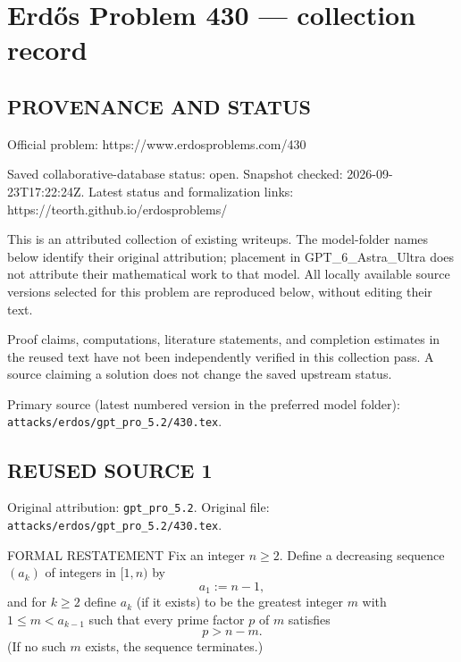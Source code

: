 \section*{Erd\H{o}s Problem 430 --- collection record}

\subsection*{PROVENANCE AND STATUS}
Official problem: https://www.erdosproblems.com/430

Saved collaborative-database status: open.
Snapshot checked: 2026-09-23T17:22:24Z.
Latest status and formalization links: https://teorth.github.io/erdosproblems/

This is an attributed collection of existing writeups. The model-folder names below identify their original attribution; placement in GPT\_6\_Astra\_Ultra does not attribute their mathematical work to that model. All locally available source versions selected for this problem are reproduced below, without editing their text.

Proof claims, computations, literature statements, and completion estimates in the reused text have not been independently verified in this collection pass. A source claiming a solution does not change the saved upstream status.

Primary source (latest numbered version in the preferred model folder): \texttt{attacks/erdos/gpt\_pro\_5.2/430.tex}.

\subsection*{REUSED SOURCE 1}
Original attribution: \texttt{gpt\_pro\_5.2}.
Original file: \texttt{attacks/erdos/gpt\_pro\_5.2/430.tex}.


FORMAL RESTATEMENT
Fix an integer $n\ge 2$. Define a decreasing sequence $(a_k)$ of integers in $[1,n)$ by
\[
 a_1:=n-1,
\]
and for $k\ge 2$ define $a_k$ (if it exists) to be the greatest integer $m$ with $1\le m<a_{k-1}$ such that every prime factor $p$ of $m$ satisfies
\[
 p>n-m.
\]
(If no such $m$ exists, the sequence terminates.)

